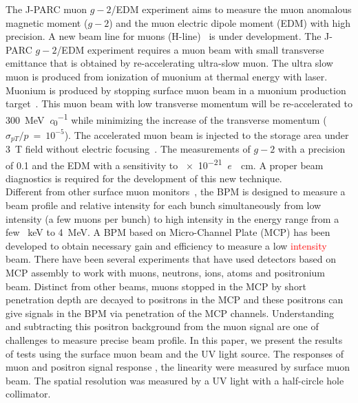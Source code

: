 \documentclass[preprint,3p,twocolumn]{elsarticle}
\begin{document}
The J-PARC muon $g-2$/EDM experiment \cite{E34} aims to measure the muon anomalous magnetic moment ($g-2$) and the muon electric dipole moment (EDM) with high precision.
A new beam line for muons (H-line)~\cite{h-line} is under development.
The J-PARC $g-2$/EDM experiment requires a muon beam with small transverse emittance that is obtained by re-accelerating ultra-slow muon. %
The ultra slow muon is produced from ionization of muonium at thermal energy with laser.
Muonium is produced by stopping surface muon beam in a muonium production target~\cite{muonium}.  
This muon beam with low transverse momentum will be re-accelerated to \SI{300}{\MeV\per\clight} \cite{IH} while minimizing the increase of the transverse momentum ($\sigma_{pT}/p~=~10^{-5}$).
The accelerated muon beam is injected to the storage area under \SI{3}{\tesla} field without electric focusing~\cite{injection}. The measurements of $g-2$ with a precision of \SI{0.1}{\ppm} and the EDM with a sensitivity to \SI{e-21}{\elementarycharge \cdot \cm}.  A proper beam diagnostics is required for the development of this new technique. \\
Different from other surface muon monitors~\cite{muon_bpm1}, the BPM is designed to measure a beam profile and relative intensity for each bunch simultaneously from low intensity (a few muons per bunch) to high intensity in the energy range from a few \SI{}{\keV} to \SI{4}{\MeV}.
A BPM based on Micro-Channel Plate (MCP) has been developed to obtain necessary gain and efficiency to measure a low \textcolor{red}{intensity} beam.
There have been several experiments that have used detectors based on MCP assembly to work with muons, neutrons, ions, atoms and positronium~\cite{muon_bpm2, neutron, Ps} beam.
Distinct from other beams, muons stopped in the MCP by short penetration depth are decayed to positrons in the MCP and these positrons can give signals in the BPM via penetration of the MCP channels. 
Understanding and subtracting this positron background from the muon signal are one of challenges to measure precise beam profile. %
In this paper, we present the results of tests using the surface muon beam and the UV light source.
The responses of muon and positron signal response %
, the linearity%
were measured by surface muon beam.
The spatial resolution was measured by a UV light with a half-circle hole collimator.
\end{document}
